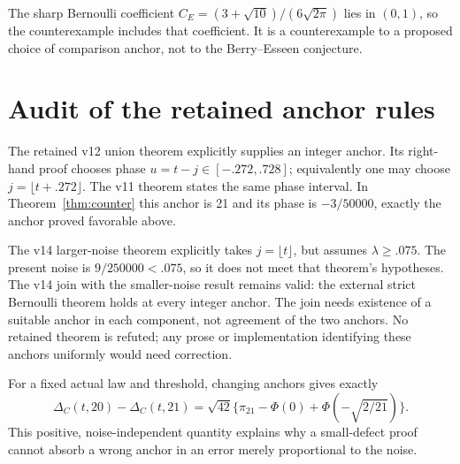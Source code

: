 \documentclass[11pt,a4paper]{article}
\begin{document}
The sharp Bernoulli coefficient $C_E=(3+\sqrt{10})/(6\sqrt{2\pi})$
lies in $(0,1)$, so the counterexample includes that coefficient. It is a
counterexample to a proposed choice of comparison anchor, not to the
Berry--Esseen conjecture.

\section{Audit of the retained anchor rules}
The retained v12 union theorem explicitly supplies an integer anchor. Its
right-hand proof chooses phase $u=t-j\in[-.272,.728]$; equivalently one may
choose $j=\lfloor t+.272\rfloor$. The v11 theorem states the same phase
interval. In Theorem~\ref{thm:counter} this anchor is 21 and its phase is
$-3/50000$, exactly the anchor proved favorable above.

The v14 larger-noise theorem explicitly takes $j=\lfloor t\rfloor$, but
assumes $\lambda\ge.075$. The present noise is $9/250000<.075$, so it does
not meet that theorem's hypotheses. The v14 join with the smaller-noise
result remains valid: the external strict Bernoulli theorem holds at every
integer anchor. The join needs existence of a suitable anchor in each
component, not agreement of the two anchors. No retained theorem is refuted;
any prose or implementation identifying these anchors uniformly would need
correction.

For a fixed actual law and threshold, changing anchors gives exactly
\[
 \Delta_C(t,20)-\Delta_C(t,21)
 =\sqrt{42}\{\pi_{21}-\Phi(0)+\Phi(-\sqrt{2/21})\}.
\]
This positive, noise-independent quantity explains why a small-defect proof
cannot absorb a wrong anchor in an error merely proportional to the noise.
\end{document}
